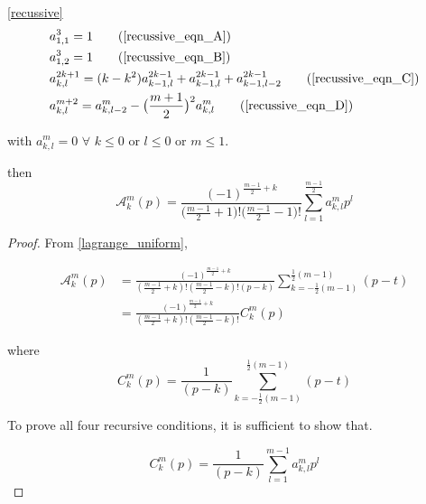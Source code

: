 \documentclass[../document.tex]{subfiles}
\begin{document}
\begin{appendices}
\begin{customthm}{\ref{recussive}}
			\begin{subequations}  
				\begin{align}
					&a^{3}_{1,1} = 1 \tag{\ref{recussive_eqn_A}}   \\
					&a^{3}_{1,2} = 1 \tag{\ref{recussive_eqn_B}}   \\
					&a^{2k+1}_{k,l} = (k - k^2) a^{2k-1}_{k-1,l} + a^{2k-1}_{k-1,l}  + a^{2k-1}_{k-1,l-2}  \tag{\ref{recussive_eqn_C}}   \\
					&a^{m+2}_{k,l} = a^{m}_{k,l-2} -
					\big( \frac{m+1}{2} \big)^2 a^{m}_{k,l} \tag{\ref{recussive_eqn_D}}   
				\end{align}
			\end{subequations}
			
			with $a^{m}_{k,l} = 0$ $\forall$ $k \leq 0 $ or $l \leq 0$ or $m \leq 1$.
			
			then
			$$
			\mathcal{A}_{k}^{m} (p) = 
			\frac{		(-1)^{\frac{m-1}{2} + k}		
			}{	\big( \frac{m-1}{2} +1 \big)!
				\big( \frac{m-1}{2} -1 \big)! 
			}
			\sum_{l=1}^{	\frac{m-1}{2}	}
			a^{m}_{k,l} p^{l}
			$$
			
		\end{customthm}
		\begin{proof}
			From \eqref{lagrange_uniform},
			
			\begin{equation*}
				\begin{split}
					\mathcal{A}_{k}^{m}(p) &= 
					\frac{ (-1)^{\frac{m-1}{2}+k} }{
						(\frac{m-1}{2} + k)!
						(\frac{m-1}{2} - k)!
						(p-k)}
					\sum_{k =-\frac{1}{2}(m-1) }^{\frac{1}{2}(m-1)}
					(p-t)
					\\
					&= 
					\frac{ (-1)^{\frac{m-1}{2}+k} }{
						(\frac{m-1}{2} + k)!
						(\frac{m-1}{2} - k)!
					}
					C_k^m(p)
				\end{split}
			\end{equation*}
			
			where
			\begin{equation} \label{120}
				C_k^m(p) = \frac{1}{(p-k)} \sum_{k =-\frac{1}{2}(m-1) }^{\frac{1}{2}(m-1)} (p-t)
			\end{equation}
			
			To prove all four recursive conditions, it is sufficient to show that.
			
			\begin{equation}  \label{121}
				C_k^m(p) = \frac{1}{(p-k)} \sum_{l=1 }^{m-1} a_{k,l}^{m}p^l
			\end{equation}
			

\end{proof}
\end{appendices}
\end{document}
